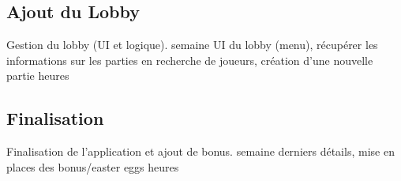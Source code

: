 \documentclass[a4paper,11pt]{article}
\begin{document}
		\subsection{Ajout du Lobby}
		\begin{enumerate}[labelwidth=5em,leftmargin=8em]
			\objectif Gestion du lobby (UI et logique).
			 semaine
			\partageTache UI du lobby (menu), récupérer les informations sur les parties en recherche de joueurs, création d'une nouvelle partie
			 heures
		\end{enumerate}
		\subsection{Finalisation}
		\begin{enumerate}[labelwidth=5em,leftmargin=8em]
			\objectif Finalisation de l'application et ajout de bonus.
			 semaine
			\partageTache derniers détails, mise en places des bonus/easter eggs
			 heures
		\end{enumerate}
\end{document}
